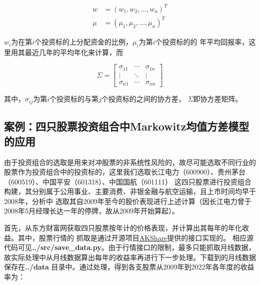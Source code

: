 \documentclass[UTF8]{ctexart}
\numberwithin{figure}{section}
\numberwithin{table}{section}
\numberwithin{equation}{section}
\begin{document}
        \begin{equation}
            \begin{aligned}
                w &= (w_1, w_2, \ldots, w_n)^T \\
                \mu &= (\mu_1, \mu_2, \ldots, \mu_n)^T
            \end{aligned}
        \end{equation}

        $w_i$为在第$i$个投资标的上分配资金的比例，$\mu_i$为第$i$个投资标的的
    年平均回报率，这里用其最近几年的平均年化来计算，而 

    \begin{equation}
        \Sigma=\left[\begin{array}{ccc}
        \sigma_{11} & \cdots & \sigma_{1 n} \\
        \vdots & \ddots & \vdots \\
        \sigma_{n 1} & \cdots & \sigma_{n n}
        \end{array}\right]
    \end{equation}

        其中，$\sigma_{ij}$为第$i$个投资标的与第$j$个投资标的之间的协方差，
    $\Sigma$即协方差矩阵。

    \subsection{案例：四只股票投资组合中Markowitz均值方差模型的应用}

        由于投资组合的选取是用来对冲股票的非系统性风险的，故尽可能选取不同行业的
    股票作为投资组合中的投资标的，这里我们选取长江电力（600900）、贵州茅台（600519）、中国平安（601318）、中国国航（601111）
    这四只股票进行投资组合构建，其分别属于公用事业、主要消费、非银金融与航空运输，且上市时间均早于2008年，分析中
    选取其自2009年至今的股价表现进行上述计算（因长江电力曾于2008年5月经理长达一年的停牌，故从2009年开始算起）。

        首先，从东方财富网获取四只股票按年计的价格表现，并计算出其每年的年化收益。其中，股票行情的
    抓取是通过开源项目\href{https://akshare.akfamily.xyz/index.html}{AKShare}提供的接口实现的。
    相应源代码可见\textbf{../src/save\_data.py}。由于行情接口的限制，最多只能抓取月线数据，
    故实际处理中从月线数据算出每年的收益率再进行下一步处理。下载到的月线数据保存在\textbf{../data}
    目录中。通过处理，得到各支股票从2009年到2022年各年度的收益率为：
\end{document}
